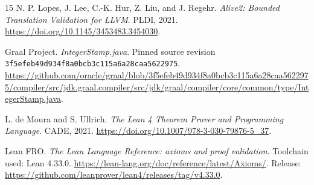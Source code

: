 \begin{thebibliography}{15}
N. P. Lopes, J. Lee, C.-K. Hur, Z. Liu, and J. Regehr.
\emph{Alive2: Bounded Translation Validation for LLVM}.
PLDI, 2021. \url{https://doi.org/10.1145/3453483.3454030}.

Graal Project.
\emph{IntegerStamp.java}.
Pinned source revision \nolinkurl{3f5efeb49d934f8a0bcb3c115a6a28caa5622975}.
\url{https://github.com/oracle/graal/blob/3f5efeb49d934f8a0bcb3c115a6a28caa5622975/compiler/src/jdk.graal.compiler/src/jdk/graal/compiler/core/common/type/IntegerStamp.java}.

L. de Moura and S. Ullrich.
\emph{The Lean 4 Theorem Prover and Programming Language}.
CADE, 2021. \url{https://doi.org/10.1007/978-3-030-79876-5_37}.

Lean FRO.
\emph{The Lean Language Reference: axioms and proof validation}.
Toolchain used: Lean 4.33.0.
\url{https://lean-lang.org/doc/reference/latest/Axioms/}.
Release: \url{https://github.com/leanprover/lean4/releases/tag/v4.33.0}.

\end{thebibliography}
